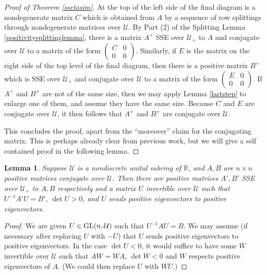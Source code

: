 \documentclass{amsart}
\newtheorem{lemma}[theorem]{Lemma}
\theoremstyle{definition}
\theoremstyle{remark}
\numberwithin{equation}{section}
\begin{document}
{{\begin{proof}[Proof of Theorem 
\ref{ssetosim}]
At the top of the left side of the final diagram is a nondegenerate matrix 
$C$ which is obtained from $A$ by a sequence of row splittings through 
nondegenerate matrices over $\mathcal U$. By Part (2) of the 
Splitting Lemma \ref{positivitysplittinglemma}, 
there is a  matrix $A^+$ SSE over $\mathcal U_+$ to $A$ and 
conjugate over  $\mathcal U$ to a matrix of  the form 
$\left(\begin{smallmatrix} C & 0 \\ 0& 0 
\end{smallmatrix}\right)$. Similarly, if $E$ is the matrix on the right 
side of the top level of the final diagram, then there is a positive 
matrix  $B^+$ which is SSE over $\mathcal U_+$ and conjugate over $\mathcal U$ 
to a matrix of the form 
$\left(\begin{smallmatrix} E & 0 \\ 0& 0 
\end{smallmatrix}\right)$. If $A^+$ and $B^+$ are not of the same size, 
then we may apply Lemma \ref{laststep}  to enlarge one of them, and assume 
they have the same size. Because $C$ and $E$ are conjugate over $\mathcal U$, 
it then follows that $A^+$ and $B^+$ are conjugate over $\mathcal U$. 

  This concludes the 
proof, apart from the ``moreover'' claim for the conjugating 
matrix. This is perhaps already clear from previous work, but 
we will give a self contained proof in the following lemma.  
\end{proof} 

\begin{lemma} 
Suppose $\mathcal U$ is a nondiscrete unital subring of $\mathbb R$, 
and $A,B$ are $n\times n$ positive matrices conjugate over 
$\mathcal U$. Then there are positive matrices $A',B'$ SSE over 
$\mathcal U_+$ to $A,B$ respectively and a matrix $U$ invertible over 
$\mathcal U$ such that $U^{-1}A'U=B'$, $\det U > 0$, and 
$U$ sends positive eigenvectors to positive eigenvectors. 
\end{lemma} 

\begin{proof} 
We are given $U\in \textnormal{GL}(n,\mathcal U)$ such that 
$U^{-1}AU=B$. We may assume (if necessary after replacing 
$U$ with $-U$) that $U$ sends positive eigenvectors to 
positive eigenvectors. 
In the case $\det U < 0$, it would suffice to have some $W$ invertible 
over $\mathcal U$ such that 
$AW=WA$, $\det W < 0$ and $W$  
respects positive eigenvectors of $A$. (We could then replace 
$U$ with $WU$.) 


\end{proof}}}
\end{document}
